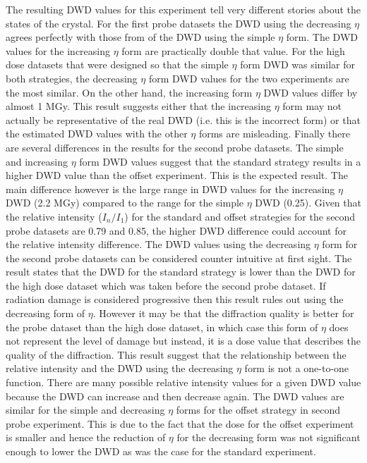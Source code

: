 The resulting DWD values for this experiment tell very different stories about the states of the crystal.
For the first probe datasets the DWD using the decreasing $\eta$ agrees perfectly with those from of the DWD using the simple $\eta$ form.
The DWD values for the increasing $\eta$ form are practically double that value.
For the high dose datasets that were designed so that the simple $\eta$ form DWD was similar for both strategies, the decreasing $\eta$ form DWD values for the two experiments are the most similar.
On the other hand, the increasing form $\eta$ DWD values differ by almost 1 MGy.
This result suggests either that the increasing $\eta$ form may not actually be representative of the real DWD (i.e. this is the incorrect form) or that the estimated DWD values with the other $\eta$ forms are misleading.
Finally there are several differences in the results for the second probe datasets.
The simple and increasing $\eta$ form DWD values suggest that the standard strategy results in a higher DWD value than the offset experiment.
This is the expected result.
The main difference however is the large range in DWD values for the increasing $\eta$ DWD (2.2 MGy) compared to the range for the simple $\eta$ DWD (0.25).
Given that the relative intensity ($I_{n}/I_{1}$) for the standard and offset strategies for the second probe datasets are 0.79 and 0.85, the higher DWD difference could account for the relative intensity difference.
The DWD values using the decreasing $\eta$ form for the second probe datasets can be considered counter intuitive at first sight.
The result states that the DWD for the standard strategy is lower than the DWD for the high dose dataset which was taken before the second probe dataset.
If radiation damage is considered progressive then this result rules out using the decreasing form of $\eta$.
However it may be that the diffraction quality is better for the probe dataset than the high dose dataset, in which case this form of $\eta$ does not represent the level of damage but instead, it is a dose value that describes the quality of the diffraction.
This result suggest that the relationship between the relative intensity and the DWD using the decreasing $\eta$ form is not a one-to-one function.
There are many possible relative intensity values for a given DWD value because the DWD can increase and then decrease again.
The DWD values are similar for the simple and decreasing $\eta$ forms for the offset strategy in second probe experiment.
This is due to the fact that the dose for the offset experiment is smaller and hence the reduction of $\eta$ for the decreasing form was not significant enough to lower the DWD as was the case for the standard experiment.
